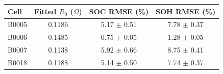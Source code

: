 \begin{tabular}{lccc}
\toprule
Cell & Fitted $R_0$ ($\Omega$) & SOC RMSE (\%) & SOH RMSE (\%) \\
\midrule
B0005 & 0.1186 & 5.17 $\pm$ 0.51 & 7.78 $\pm$ 0.37 \\
B0006 & 0.1485 & 0.75 $\pm$ 0.05 & 1.28 $\pm$ 0.05 \\
B0007 & 0.1138 & 5.92 $\pm$ 0.66 & 8.75 $\pm$ 0.41 \\
B0018 & 0.1188 & 5.14 $\pm$ 0.50 & 7.74 $\pm$ 0.37 \\
\bottomrule
\end{tabular}
